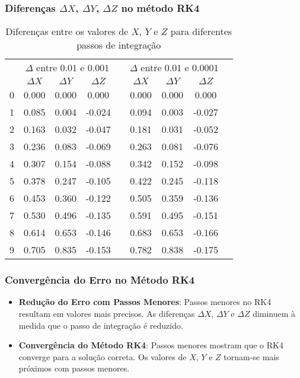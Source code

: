 

\begin{frame}
    \frametitle{Diferenças \(\Delta X\), \(\Delta Y\), \(\Delta Z\) no método RK4}
    \scriptsize %
    \begin{table}[H]
    \centering
    \begin{tabular}{c c c c c c c c c}
    \toprule
     & \multicolumn{3}{c}{\(\Delta\) entre \(0.01\) e \(0.001\)} & & \multicolumn{3}{c}{\(\Delta\) entre \(0.01\) e \(0.0001\)} \\
    \cmidrule{2-4} \cmidrule{6-8}
     & \(\Delta X\) & \(\Delta Y\) & \(\Delta Z\) & & \(\Delta X\) & \(\Delta Y\) & \(\Delta Z\) \\
    \midrule
    0  & 0.000 & 0.000 & 0.000 & & 0.000 & 0.000 & 0.000 \\
    1  & 0.085 & 0.004 & -0.024 & & 0.094 & 0.003 & -0.027 \\
    2  & 0.163 & 0.032 & -0.047 & & 0.181 & 0.031 & -0.052 \\
    3  & 0.236 & 0.083 & -0.069 & & 0.263 & 0.081 & -0.076 \\
    4  & 0.307 & 0.154 & -0.088 & & 0.342 & 0.152 & -0.098 \\
    5  & 0.378 & 0.247 & -0.105 & & 0.422 & 0.245 & -0.118 \\
    6  & 0.453 & 0.360 & -0.122 & & 0.505 & 0.359 & -0.136 \\
    7  & 0.530 & 0.496 & -0.135 & & 0.591 & 0.495 & -0.151 \\
    8  & 0.614 & 0.653 & -0.146 & & 0.683 & 0.653 & -0.166 \\
    9  & 0.705 & 0.835 & -0.153 & & 0.782 & 0.838 & -0.175 \\
    \bottomrule
    \end{tabular}
    \caption{Diferenças entre os valores de \(X\), \(Y\) e \(Z\) para diferentes passos de integração}
    \end{table}
\end{frame}




\begin{frame}
    \frametitle{Convergência do Erro no Método RK4}
    \begin{itemize}
        \item \textbf{Redução do Erro com Passos Menores}: Passos menores no RK4 resultam em valores mais precisos. As diferenças \(\Delta X\), \(\Delta Y\) e \(\Delta Z\) diminuem à medida que o passo de integração é reduzido. 
        \item \textbf{Convergência do Método RK4}: Passos menores mostram que o RK4 converge para a solução correta. Os valores de \(X\), \(Y\) e \(Z\) tornam-se mais próximos com passos menores.
    \end{itemize}
        
\end{frame}
